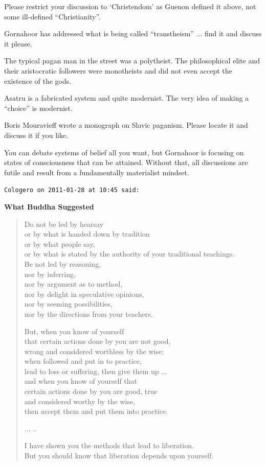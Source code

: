 \begin{footnotesize}
\begin{sffamily}
Please restrict your discussion to `Christendom' as Guenon defined it above, not some ill-defined ``Christianity''.

Gornahoor has addressed what is being called ``transtheism'' ... find it and discuss it please.

The typical pagan man in the street was a polytheist. The philosophical elite and their aristocratic followers were monotheists and did not even accept the existence of the gods.

Asatru is a fabricated system and quite modernist. The very idea of making a ``choice'' is modernist.

Boris Mouravieff wrote a monograph on Slavic paganism. Please locate it and discuss it if you like.

You can debate systems of belief all you want, but Gornahoor is focusing on states of consciousness that can be attained. Without that, all discussions are futile and result from a fundamentally materialist mindset.

\hfill

\texttt{Cologero on 2011-01-28 at 10:45 said:}

\textbf{What Buddha Suggested}
\begin{verse}
Do not be led by hearsay\\
or by what is handed down by tradition\\
or by what people say,\\
or by what is stated by the authority of your traditional teachings.\\
Be not led by reasoning,\\
nor by inferring,\\
nor by argument as to method,\\
nor by delight in speculative opinions,\\
nor by seeming possibilities,\\
nor by the directions from your teachers.

But, when you know of yourself\\
that certain actions done by you are not good,\\
wrong and considered worthless by the wise;\\
when followed and put in to practice,\\
lead to loss or suffering, then give them up ... \\
and when you know of yourself that\\
certain actions done by you are good, true\\
and considered worthy by the wise,\\
then accept them and put them into practice.

... ..

I have shown you the methods that lead to liberation.\\
But you should know that liberation depends upon yourself.
\end{verse}

\hfill

\end{sffamily}
\end{footnotesize}

